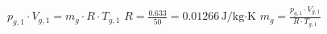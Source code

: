 \( p_{g,1} \cdot V_{g,1} = m_g \cdot R \cdot T_{g,1} \)  
\( R = \frac{0.633}{50} = 0.01266 \, \text{J/kg·K} \)  
\( m_g = \frac{p_{g,1} \cdot V_{g,1}}{R \cdot T_{g,1}} \)